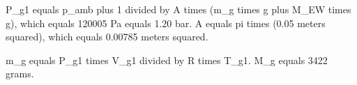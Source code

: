P_g1 equals p_amb plus 1 divided by A times (m_g times g plus M_EW times g), which equals 120005 Pa equals 1.20 bar.  
A equals pi times (0.05 meters squared), which equals 0.00785 meters squared.  

m_g equals P_g1 times V_g1 divided by R times T_g1.  
M_g equals 3422 grams.